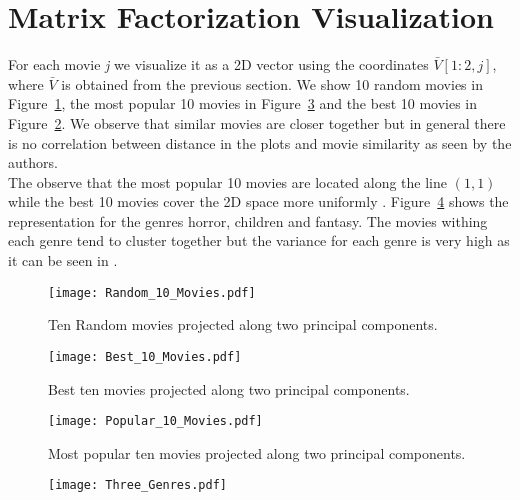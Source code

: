 \section{Matrix Factorization Visualization}

For each movie \textit{j} we visualize it as a 2D vector using the coordinates $\bar{V}[1:2,j]$, where $\bar{V}$ is obtained from the previous section. We show 10 random movies in Figure~\ref{fig:tenRandom}, the most popular 10 movies in Figure~\ref{fig:tenMostPopular} and the best 10 movies in Figure~\ref{fig:tenBest}. We observe that similar movies are closer together but in general there is no correlation between distance in the plots and movie similarity as seen by the authors. \\
The observe that the most popular 10 movies are located along the line $(1,1)$ while the best 10 movies cover the 2D space more uniformly .
Figure~\ref{fig:tg} shows the representation for the genres horror, children and fantasy. The movies withing each genre tend to cluster together but the variance for each genre is very high as it can be seen in .

\begin{figure}[hptb]
\centering
\texttt{[image: Random\_10\_Movies.pdf]}
 \caption{Ten Random movies projected along two principal components.}
\label{fig:tenRandom}
\end{figure}


\begin{figure}[hptb]
\centering
\texttt{[image: Best\_10\_Movies.pdf]}
 \caption{Best ten movies projected along two principal components.}
\label{fig:tenBest}
\end{figure}


\begin{figure}[hptb]
\centering
\texttt{[image: Popular\_10\_Movies.pdf]}
 \caption{Most popular ten movies projected along two principal components.}
\label{fig:tenMostPopular}
\end{figure}


\begin{figure}[hptb]
\centering
\texttt{[image: Three\_Genres.pdf]}
 \caption{ }
\label{fig:tg}
\end{figure}